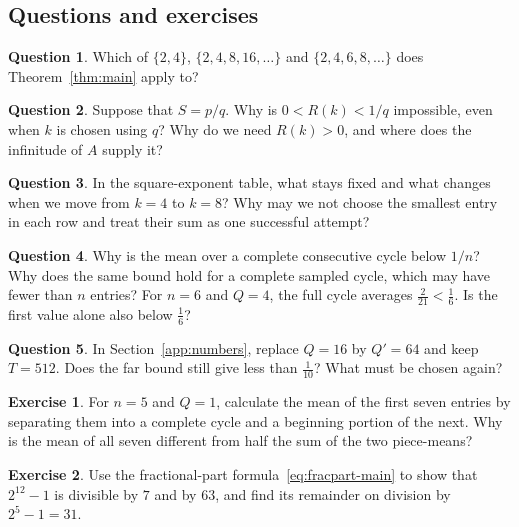 \documentclass[10pt]{article}
\theoremstyle{plain}
\theoremstyle{definition}
\newtheorem{exercise}{Exercise}
\newtheorem{readercheck}{Question}
\theoremstyle{remark}
\begin{document}
\clearpage
\begin{samepage}
\section{Questions and exercises}\label{sec:exercises}

\begin{readercheck}\label{chk:hypotheses}
Which of $\{2,4\}$, $\{2,4,8,16,\dots\}$ and $\{2,4,6,8,\dots\}$ does
Theorem~\ref{thm:main} apply to?
\end{readercheck}
\end{samepage}

\begin{readercheck}\label{chk:positive}
Suppose that $S=p/q$. Why is $0<R(k)<1/q$ impossible, even when $k$
is chosen using $q$? Why do we need $R(k)>0$, and where does the
infinitude of $A$ supply it?
\end{readercheck}

\begin{readercheck}\label{chk:columns}
In the square-exponent table, what stays fixed and what changes when
we move from $k=4$ to $k=8$? Why may we not choose the smallest entry in
each row and treat their sum as one successful attempt?
\end{readercheck}

\begin{readercheck}\label{chk:partial}
Why is the mean over a complete consecutive cycle below $1/n$? Why
does the same bound hold for a complete sampled cycle, which may have fewer
than $n$ entries? For $n=6$ and $Q=4$, the full cycle averages
$\tfrac2{21}<\tfrac16$. Is the first value alone also below $\tfrac16$?
\end{readercheck}

\begin{readercheck}\label{chk:order}
In Section~\ref{app:numbers}, replace $Q=16$ by $Q'=64$ and keep
$T=512$. Does the far bound still give less than $\tfrac1{10}$? What must
be chosen again?
\end{readercheck}

\begin{exercise}\label{ex:2}
For $n=5$ and $Q=1$, calculate the mean of the first seven entries by
separating them into a complete cycle and a beginning portion of the
next. Why is the mean of all seven different from half the sum of the
two piece-means?
\end{exercise}

\begin{exercise}\label{ex:3}
Use the fractional-part formula~\eqref{eq:fracpart-main} to show that $2^{12}-1$ is divisible by $7$ and
by $63$, and find its remainder on division by $2^5-1=31$.
\end{exercise}
\end{document}
